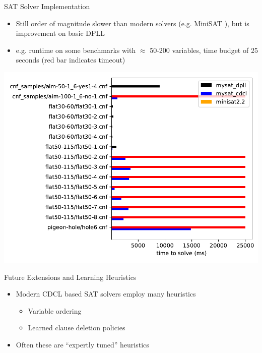 \documentclass{beamer}
\begin{document}
\begin{frame}{SAT Solver Implementation}
    \begin{itemize}
        \item Still order of magnitude slower than modern solvers (e.g. MiniSAT \cite{04minisat}), but is improvement on basic DPLL
        \pause
        \item e.g. runtime on some benchmarks with $\approx$ 50-200 variables, time budget of 25 seconds (red bar indicates timeout)
    \end{itemize}
    \begin{center}
        \includegraphics[scale=0.45]{../../results/compare.pdf}
    \end{center}
\end{frame}



\begin{frame}{Future Extensions and Learning Heuristics}
    \begin{itemize}
        \item Modern CDCL based SAT solvers employ many heuristics
            \begin{itemize}
                \item Variable ordering
                \item Learned clause deletion policies
            \end{itemize}
        \item Often these are ``expertly tuned'' heuristics

    \end{itemize}
\end{frame}
\end{document}
